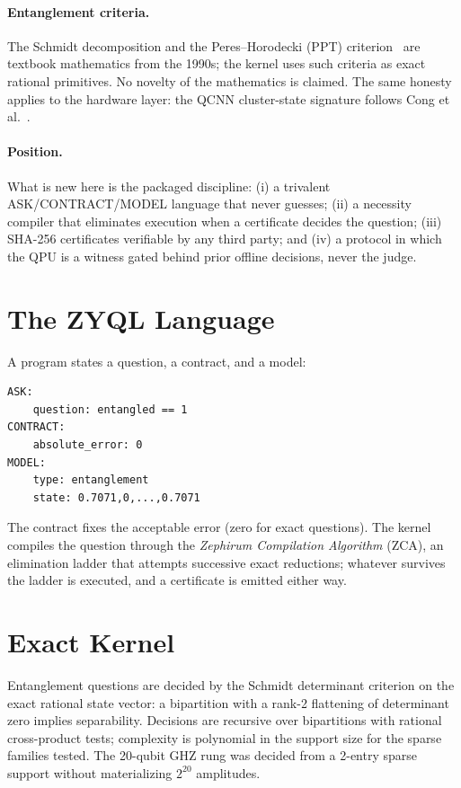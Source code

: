 \documentclass[11pt]{article}
\begin{document}
\paragraph{Entanglement criteria.}
The Schmidt decomposition and the Peres--Horodecki (PPT)
criterion~\cite{peres,horodecki} are textbook mathematics from the 1990s; the
kernel uses such criteria as exact rational primitives. No novelty of the
mathematics is claimed. The same honesty applies to the hardware layer: the
QCNN cluster-state signature follows Cong et al.~\cite{qcnn}.

\paragraph{Position.}
What is new here is the packaged discipline: (i) a trivalent
ASK/CONTRACT/MODEL language that never guesses; (ii) a necessity compiler
that eliminates execution when a certificate decides the question; (iii)
SHA-256 certificates verifiable by any third party; and (iv) a protocol in
which the QPU is a witness gated behind prior offline decisions, never the
judge.

\section{The ZYQL Language}
A program states a question, a contract, and a model:
\begin{verbatim}
ASK:
    question: entangled == 1
CONTRACT:
    absolute_error: 0
MODEL:
    type: entanglement
    state: 0.7071,0,...,0.7071
\end{verbatim}
The contract fixes the acceptable error (zero for exact questions). The
kernel compiles the question through the \emph{Zephirum Compilation
Algorithm} (ZCA), an elimination ladder that attempts successive exact
reductions; whatever survives the ladder is executed, and a certificate
is emitted either way.

\section{Exact Kernel}
Entanglement questions are decided by the Schmidt determinant criterion on
the exact rational state vector: a bipartition with a rank-2 flattening
of determinant zero implies separability. Decisions are recursive over
bipartitions with rational cross-product tests; complexity is polynomial
in the support size for the sparse families tested. The 20-qubit GHZ
rung was decided from a 2-entry sparse support without materializing
$2^{20}$ amplitudes.
\end{document}
